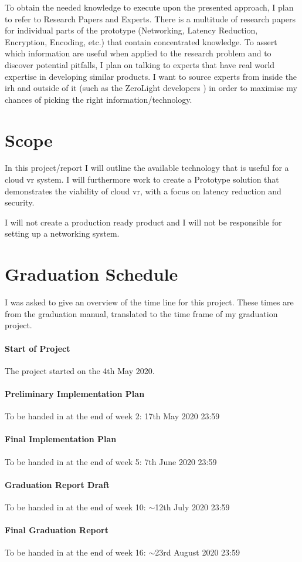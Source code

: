 \documentclass[]{article}
\begin{document}
To obtain the needed knowledge to execute upon the presented approach, I plan to refer to Research Papers and Experts. There is a multitude of research papers for individual parts of the prototype (Networking, Latency Reduction, Encryption, Encoding, etc.) that contain concentrated knowledge. To assert which information are useful when applied to the research problem and to discover potential pitfalls, I plan on talking to experts that have real world expertise in developing similar products. I want to source experts from inside the \acrfull{irh} and outside of it (such as the ZeroLight developers \parencite{zerolight5g}) in order to maximise my chances of picking the right information/technology. 

\newpage
\section{Scope}
In this project/report I will outline the available technology that is useful for a cloud \acrshort{vr} system. I will furthermore work to create a Prototype solution that demonstrates the viability of cloud \acrshort{vr}, with a focus on latency reduction and security.

I will not create a production ready product and I will not be responsible for setting up a networking system.

\newpage
\section{Graduation Schedule}
I was asked to give an overview of the time line for this project. These times are from the graduation manual, translated to the time frame of my graduation project. 
\paragraph{Start of Project}
The project started on the 4th May 2020.
\paragraph{Preliminary Implementation Plan}
To be handed in at the end of week 2: 17th May 2020 23:59
\paragraph{Final Implementation Plan}
To be handed in at the end of week 5: 7th June 2020 23:59
\paragraph{Graduation Report Draft}
To be handed in at the end of week 10: $\sim$12th July 2020 23:59
\paragraph{Final Graduation Report}
To be handed in at the end of week 16: $\sim$23rd August 2020 23:59

\newpage
\printbibliography
\end{document}
